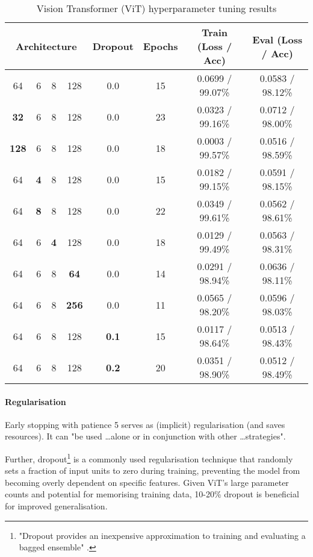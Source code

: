 \begin{table}[h!]
    \centering
    \begin{tabular}{|c|c|c|c|c|c|c|c|}
    \hline
    \multicolumn{4}{|c|}{Architecture} & Dropout & Epochs & Train (Loss / Acc) & Eval (Loss / Acc) \\
    \hline
    64 & 6 & 8 & 128 & 0.0 & 15 & 0.0699 / 99.07\% & 0.0583 / 98.12\% \\
    \hline
    \textbf{32} & 6 & 8 & 128 & 0.0 & 23 & 0.0323 / 99.16\% & 0.0712 / 98.00\% \\
    \hline
    \textbf{128} & 6 & 8 & 128 & 0.0 & 18 & 0.0003 / 99.57\% & 0.0516 / 98.59\% \\
    \hline
    64 & \textbf{4} & 8 & 128 & 0.0 & 15 & 0.0182 / 99.15\% & 0.0591 / 98.15\% \\
    \hline
    64 & \textbf{8} & 8 & 128 & 0.0 & 22 & 0.0349 / 99.61\% & 0.0562 / 98.61\% \\
    \hline
    64 & 6 & \textbf{4} & 128 & 0.0 & 18 & 0.0129 / 99.49\% & 0.0563 / 98.31\% \\
    \hline
    64 & 6 & 8 & \textbf{64} & 0.0 & 14 & 0.0291 / 98.94\% & 0.0636 / 98.11\% \\
    \hline
    64 & 6 & 8 & \textbf{256} & 0.0 & 11 & 0.0565 / 98.20\% & 0.0596 / 98.03\% \\
    \hline
    64 & 6 & 8 & 128 & \textbf{0.1} & 15 & 0.0117 / 98.64\% & 0.0513 / 98.43\% \\
    \hline
    64 & 6 & 8 & 128 & \textbf{0.2} & 20 & 0.0351 / 98.90\% & 0.0512 / 98.49\% \\
    \hline
    \end{tabular}
    \caption{Vision Transformer (ViT) hyperparameter tuning results}
    \label{tab:vit-results}
\end{table}
\vspace{-20pt}

\paragraph{Regularisation}

Early stopping with patience 5 serves as (implicit) regularisation (and saves resources). It can "be used \dots alone or in conjunction with other \dots strategies". \citep{Goodfellowetal2016}

Further, dropout\footnote{
    "Dropout provides an inexpensive approximation to training and evaluating a bagged ensemble" \citep{Goodfellowetal2016}.
} is a commonly used regularisation technique that randomly sets a fraction of input units to zero during training, preventing the model from becoming overly dependent on specific features.
Given ViT's large parameter counts and potential for memorising training data,
10-20\% dropout is beneficial for improved generalisation.
